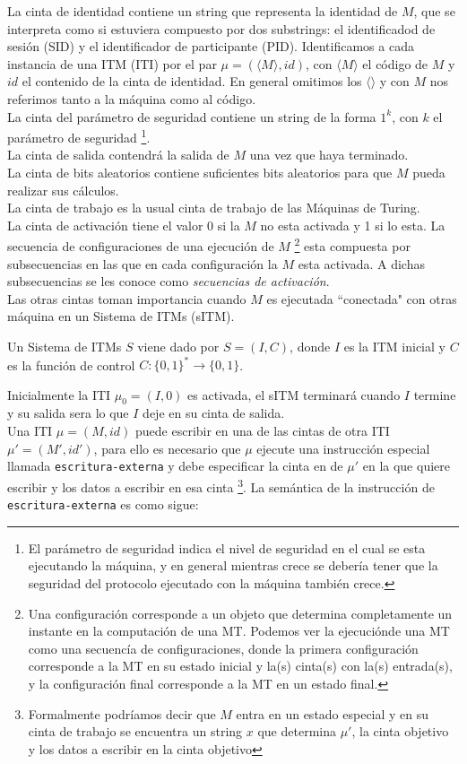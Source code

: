 La cinta de identidad contiene un string que representa la identidad de $M$, que se interpreta
como si estuviera compuesto por dos substrings: el identificadod de sesión (SID) y el identificador
de participante (PID). Identificamos a cada instancia de una ITM (ITI) por el par
$\mu = (\langle M \rangle, id)$, con $\langle M \rangle$ el código de $M$ y $id$ el contenido de la cinta
de identidad. En general omitimos los $\langle \rangle$ y con $M$ nos referimos tanto a la máquina como
al código.\\
La cinta del parámetro de seguridad contiene un string de la forma $1^k$, con $k$ el parámetro de seguridad 
\footnote{El parámetro de seguridad indica el nivel de seguridad en el cual se esta ejecutando
la máquina, y en general mientras crece se debería tener que la seguridad del protocolo ejecutado
con la máquina también crece.}.\\
La cinta de salida contendrá la salida de $M$ una vez que haya terminado.\\
La cinta de bits aleatorios contiene suficientes bits aleatorios para que $M$ pueda realizar sus cálculos.\\
La cinta de trabajo es la usual cinta de trabajo de las Máquinas de Turing.\\
La cinta de activación tiene el valor 0 si la $M$ no esta activada y 1 si lo esta. La secuencia de
configuraciones de una ejecución de $M$
\footnote{Una configuración corresponde a un objeto que determina completamente un instante
en la computación de una MT. Podemos ver la ejecuciónde una MT como una secuencía de configuraciones, donde la
primera configuración corresponde a la MT en su estado inicial y la(s) cinta(s) con la(s) entrada(s), y la
configuración final corresponde a la MT en un estado final.}
esta compuesta por subsecuencias en las
que en cada configuración la $M$ esta activada. A dichas subsecuencias se les conoce como \textit{secuencias
de activación}.\\
Las otras cintas toman importancia cuando $M$ es ejecutada ``conectada" con otras máquina
en un Sistema de ITMs (sITM).\\

\begin{definicion}
Un Sistema de ITMs $S$ viene dado por $S = (I, C)$, donde $I$ es la ITM inicial y $C$ es la función
de control $C:\{0,1\}^* \to \{0,1\}$.
\end{definicion}
Inicialmente la ITI $\mu_0 = (I, 0)$ es activada, el sITM terminará cuando $I$ termine y su
salida sera lo que $I$ deje en su cinta de salida.\\
Una ITI $\mu = (M, id)$ puede escribir en una de las cintas de otra ITI $\mu' = (M', id')$, 
para ello es necesario que $\mu$ ejecute una instrucción
especial llamada \texttt{escritura-externa} y debe especificar la cinta en de $\mu'$ en la que quiere
escribir y los datos a escribir en esa cinta
\footnote{Formalmente podríamos decir que $M$ entra en un estado especial y en su cinta de
trabajo se encuentra un string $x$ que determina $\mu'$, la cinta objetivo y los datos a escribir
en la cinta objetivo}.
La semántica de la instrucción de \texttt{escritura-externa} es como sigue:\\

